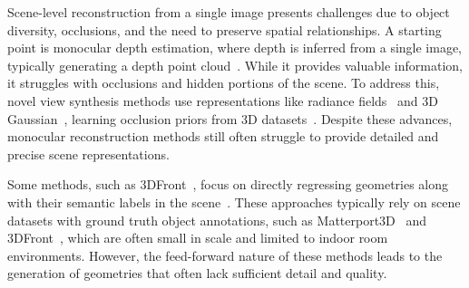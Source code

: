 
Scene-level reconstruction from a single image presents challenges due to object diversity, occlusions, and the need to preserve spatial relationships. A starting point is monocular depth estimation, where depth is inferred from a single image, typically generating a depth point cloud~\cite{yin2023metric3d,bhat2023zoedepth,piccinelli2024unidepth,wang2024moge,yang2024depth}. While it provides valuable information, it struggles with occlusions and hidden portions of the scene. 
To address this, novel view synthesis methods use representations like radiance fields~\cite{yu2021pixelnerf, tian2023mononerf, yu2022monosdf} and 3D Gaussian~\cite{szymanowicz2024splatter,szymanowicz2024flash3d}, learning occlusion priors from 3D datasets~\cite{geiger2013vision,dai2017scannet, chang2015shapenet,sun2018pix3d}. Despite these advances, monocular reconstruction methods still often struggle to provide detailed and precise scene representations.

Some methods, such as 3DFront~\cite{fu20213d}, focus on directly regressing geometries along with their semantic labels in the scene~\cite{dahnert2021panoptic, gkioxari2022learning, chu2023buol, chen2024single}. These approaches typically rely on scene datasets with ground truth object annotations, such as Matterport3D~\cite{fu20213d} and 3DFront~\cite{fu20213d}, which are often small in scale and limited to indoor room environments. However, the feed-forward nature of these methods leads to the generation of geometries that often lack sufficient detail and quality.


